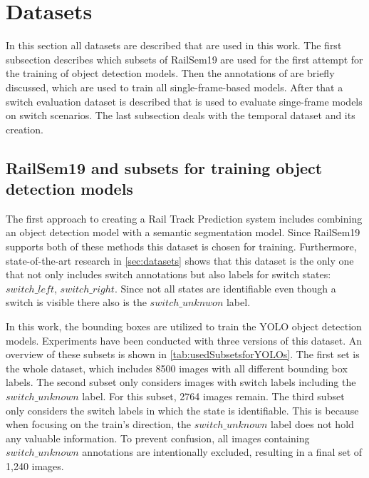 \section{Datasets}
\label{sec:usedDatasets}

In this section all datasets are described that are used in this work.
The first subsection describes which subsets of RailSem19 are used for the first attempt for the training of object detection models.
Then the annotations of \cite{tepNet2024} are briefly discussed, which are used to train all single-frame-based models.
After that a switch evaluation dataset is described that is used to evaluate singe-frame models on switch scenarios.
The last subsection deals with the temporal dataset and its creation.


\subsection{RailSem19 and subsets for training object detection models}
\label{sec:usedDatasetsYOLOs}

The first approach to creating a Rail Track Prediction system includes combining an object detection model with a semantic segmentation model.
Since RailSem19 supports both of these methods this dataset is chosen for training.
Furthermore, state-of-the-art research in \autoref{sec:datasets} shows that this dataset is the only one that not only includes switch annotations but also labels for switch states: $switch\_left$, $switch\_right$.
Since not all states are identifiable even though a switch is visible there also is the $switch\_unknwon$ label.

In this work, the bounding boxes are utilized to train the \ac{YOLO} object detection models.
Experiments have been conducted with three versions of this dataset.
An overview of these subsets is shown in \autoref{tab:usedSubsetsforYOLOs}.
The first set is the whole dataset, which includes 8500 images with all different bounding box labels.
The second subset only considers images with switch labels including the $switch\_unknown$ label.
For this subset, 2764 images remain. The third subset only considers the switch labels in which the state is identifiable.
This is because when focusing on the train's direction, the $switch\_unknown$ label does not hold any valuable information.
To prevent confusion, all images containing $switch\_unknown$ annotations are intentionally excluded, resulting in a final set of 1,240 images.

